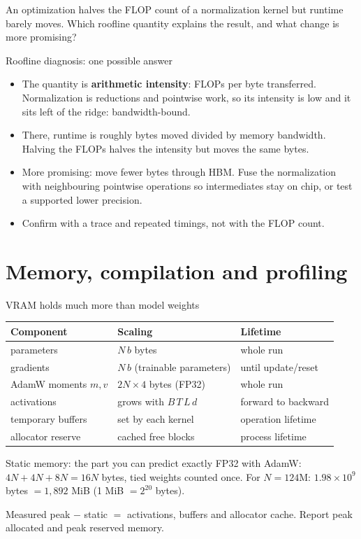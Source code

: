 \documentclass[handout]{beamer}
\begin{document}
{An optimization halves the FLOP count of a normalization kernel but runtime barely moves. Which roofline quantity explains the result, and what change is more promising?}

\begin{frame}{Roofline diagnosis: one possible answer}
  \begin{itemize}
      \setlength{\itemsep}{8pt}
    \item The quantity is \textbf{arithmetic intensity}: FLOPs per byte transferred. Normalization is reductions and pointwise work, so its intensity is low and it sits left of the ridge: bandwidth-bound.
    \item There, runtime is roughly bytes moved divided by memory bandwidth. Halving the FLOPs halves the intensity but moves the same bytes.
    \item More promising: move fewer bytes through HBM. Fuse the normalization with neighbouring pointwise operations so intermediates stay on chip, or test a supported lower precision.
    \item Confirm with a trace and repeated timings, not with the FLOP count.
  \end{itemize}
\end{frame}

\section{Memory, compilation and profiling}

\begin{frame}{VRAM holds much more than model weights}
  \small
  \begin{tabular}{lll}
    \toprule
    Component & Scaling & Lifetime \\
    \midrule
    parameters & $N\,b$ bytes & whole run \\
    gradients & $N\,b$ (trainable parameters) & until update/reset \\
    AdamW moments $m,v$ & $2N\times4$ bytes (FP32) & whole run \\
    \midrule
    activations & grows with $B\,T\,L\,d$ & forward to backward \\
    temporary buffers & set by each kernel & operation lifetime \\
    allocator reserve & cached free blocks & process lifetime \\
    \bottomrule
  \end{tabular}
  \vfill
  \begin{block}{Static memory: the part you can predict exactly}
    FP32 with AdamW: $4N+4N+8N=16N$ bytes, tied weights counted once. For $N=124$M: $1.98\times10^{9}$ bytes $=1{,}892$ MiB (1 MiB $=2^{20}$ bytes).
  \end{block}
  \footnotesize Measured peak $-$ static $=$ activations, buffers and allocator cache. Report peak allocated and peak reserved memory.
\end{frame}
\end{document}
